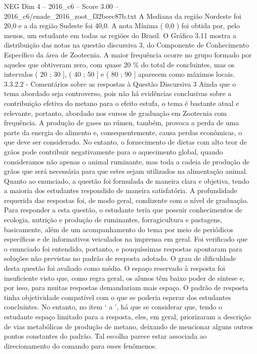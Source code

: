 \begin{textsample}{NEG Dim 4 – 2016\_c6 – Score 3.00 – 2016\_c6/enade\_2016\_zoot\_f32beec87b.txt}
A Mediana da região Nordeste foi 20,0 e a da região Sudeste foi 40,0.
A nota Mínima ( 0,0 ) foi obtida por, pelo menos, um estudante em todas as regiões do Brasil.
O Gráfico 3.11 mostra a distribuição das notas na questão discursiva 3, do Componente de Conhecimento Específico da área de Zootecnia.
A maior frequência ocorre no grupo formado por aqueles que obtiveram zero, com quase 20 \% do total de concluintes, mas os intervalos ( 20 ; 30 ], ( 40 ; 50 ] e ( 80 ; 90 ] aparecem como máximos locais. 3.3.2.2 - Comentários sobre as respostas à Questão Discursiva 3 Ainda que o tema abordado seja controverso, pois não há evidências conclusivas sobre a contribuição efetiva do metano para o efeito estufa, o tema é bastante atual e relevante, portanto, abordado nos cursos de graduação em Zootecnia com frequência.
A produção de gases no rúmen, também, provoca a perda de uma parte da energia do alimento e, consequentemente, causa perdas econômicas, o que deve ser considerado.
No entanto, o fornecimento de dietas com alto teor de grãos pode contribuir negativamente para o aquecimento global, quando consideramos não apenas o animal ruminante, mas toda a cadeia de produção de grãos que será necessária para que estes sejam utilizados na alimentação animal.
Quanto ao enunciado, a questão foi formulada de maneira clara e objetiva, tendo a maioria dos estudantes respondido de maneira satisfatória.
A profundidade requerida das respostas foi, de modo geral, condizente com o nível de graduação.
Para responder a esta questão, o estudante teria que possuir conhecimentos de ecologia, nutrição e produção de ruminantes, forragicultura e pastagens, basicamente, além de um acompanhamento do tema por meio de periódicos específicos e de informativos veiculados na imprensa em geral.
Foi verificado que o enunciado foi entendido, portanto, e pouquíssimas respostas apontaram para soluções não previstas no padrão de resposta adotado.
O grau de dificuldade desta questão foi avaliado como médio.
O espaço reservado à resposta foi insuficiente visto que, como regra geral, os alunos têm baixo poder de síntese e, por isso, para muitas respostas demandariam mais espaço.
O padrão de resposta tinha objetividade compatível com o que se poderia esperar dos estudantes concluintes.
No entanto, no item ‘ a ’, há que se considerar que, tendo o estudante espaço limitado para a resposta, eles, em geral, priorizaram a descrição de vias metabólicas de produção de metano, deixando de mencionar alguns outros pontos constantes do padrão.
Tal escolha parece estar associada ao direcionamento do comando para esses fenômenos.

\end{textsample}
